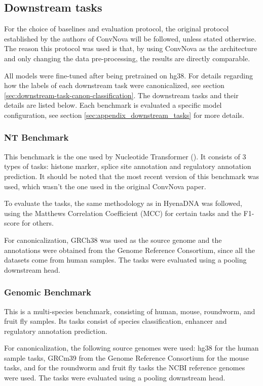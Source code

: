 \documentclass[   ]{article}
\begin{document}
\subsection{Downstream tasks}
For the choice of baselines and evaluation protocol, the original protocol established by the authors of ConvNova
\citep{boRevisitingConvolutionArchitecture2025} will be followed, unless stated
otherwise. The reason this protocol was used is that, by using ConvNova
as the architecture and only changing the data pre-processing, the
results are directly comparable.

All models were fine-tuned after being pretrained on hg38. For details
regarding how the labels of each downstream task were canonicalized, see
section \ref{sec:downstream-task-canon-classification}. The downstream tasks and their details are listed below. Each benchmark is evaluated a specific model configuration, see section \ref{sec:appendix_downstream_tasks} for more details.

\subsubsection{NT Benchmark} 
This benchmark is the one used by Nucleotide Transformer
(\cite{dalla-torreNucleotideTransformerBuilding2025}). It consists of 3
types of tasks: histone marker, splice site annotation and regulatory annotation prediction. It should be noted
that the most recent version of this benchmark was used, which wasn't the one used in the original ConvNova paper.

To evaluate the tasks, the same methodology as in HyenaDNA \citep{nguyenHyenaDNALongRangeGenomic2023} was followed, using the
Matthews Correlation Coefficient (MCC) for certain tasks and the
F1-score for others.

For canonicalization, GRCh38 was used as the source genome and the annotations were obtained from the Genome Reference Consortium, since all the datasets come from human samples. The tasks were evaluated using a pooling downstream head.

\subsubsection{Genomic Benchmark}
This is a multi-species benchmark, consisting of human, mouse,
roundworm, and fruit fly samples. Its tasks consist of species classification, enhancer and regulatory annotation prediction.

For canonicalization, the following source genomes were used: hg38 for
the human sample tasks, GRCm39 from the Genome Reference Consortium for the mouse tasks, and for the roundworm and fruit fly
tasks the NCBI reference genomes were used. The tasks were evaluated using a pooling downstream head.
\end{document}
